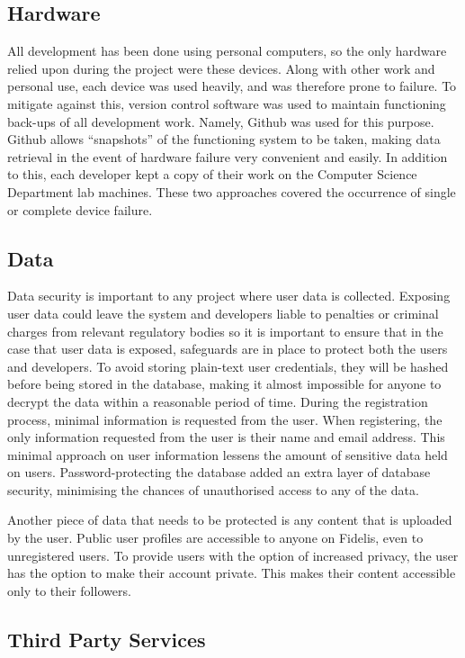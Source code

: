 \subsection{Hardware}
All development has been done using personal computers, so the only hardware relied upon during the project were these devices. Along with other work and personal use, each device was used heavily, and was therefore prone to failure. To mitigate against this, version control software was used to maintain functioning back-ups of all development work. Namely, Github was used for this purpose. Github allows ``snapshots'' of the functioning system to be taken, making data retrieval in the event of hardware failure very convenient and easily. In addition to this, each developer kept a copy of their work on the Computer Science Department lab machines. These two approaches covered the occurrence of single or complete device failure.

\subsection{Data}
Data security is important to any project where user data is collected. Exposing user data could leave the system and developers liable to penalties or criminal charges from relevant regulatory bodies so it is important to ensure that in the case that user data is exposed, safeguards are in place to protect both the users and developers. To avoid storing plain-text user credentials, they will be hashed before being stored in the database, making it almost impossible for anyone to decrypt the data within a reasonable period of time. During the registration process, minimal information is requested from the user. When registering, the only information requested from the user is their name and email address. This minimal approach on user information lessens the amount of sensitive data held on users. Password-protecting the database added an extra layer of database security, minimising the chances of unauthorised access to any of the data.

Another piece of data that needs to be protected is any content that is uploaded by the
user. Public user profiles are accessible to anyone on Fidelis, even to unregistered users. To provide users with the option of increased privacy, the user has the option to make their account private. This makes their content accessible only to their followers.

\subsection{Third Party Services}